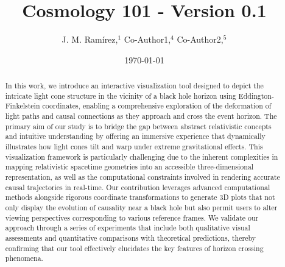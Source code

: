 \documentclass{article}
\title{Cosmology 101 - Version 0.1}
\author{J. M. Ram{\'i}rez,$^{1}$ Co-Author1,$^{4}$ Co-Author2,$^{5}$}
\date{\today}
\begin{document}
\maketitle

 \begin{abstract}

In this work, we introduce an interactive visualization tool designed to depict the intricate light cone structure in the vicinity of a black hole horizon using Eddington-Finkelstein coordinates, enabling a comprehensive exploration of the deformation of light paths and causal connections as they approach and cross the event horizon. The primary aim of our study is to bridge the gap between abstract relativistic concepts and intuitive understanding by offering an immersive experience that dynamically illustrates how light cones tilt and warp under extreme gravitational effects. This visualization framework is particularly challenging due to the inherent complexities in mapping relativistic spacetime geometries into an accessible three-dimensional representation, as well as the computational constraints involved in rendering accurate causal trajectories in real-time. Our contribution leverages advanced computational methods alongside rigorous coordinate transformations to generate 3D plots that not only display the evolution of causality near a black hole but also permit users to alter viewing perspectives corresponding to various reference frames. We validate our approach through a series of experiments that include both qualitative visual assessments and quantitative comparisons with theoretical predictions, thereby confirming that our tool effectively elucidates the key features of horizon crossing phenomena.

 \end{abstract}
\end{document}
